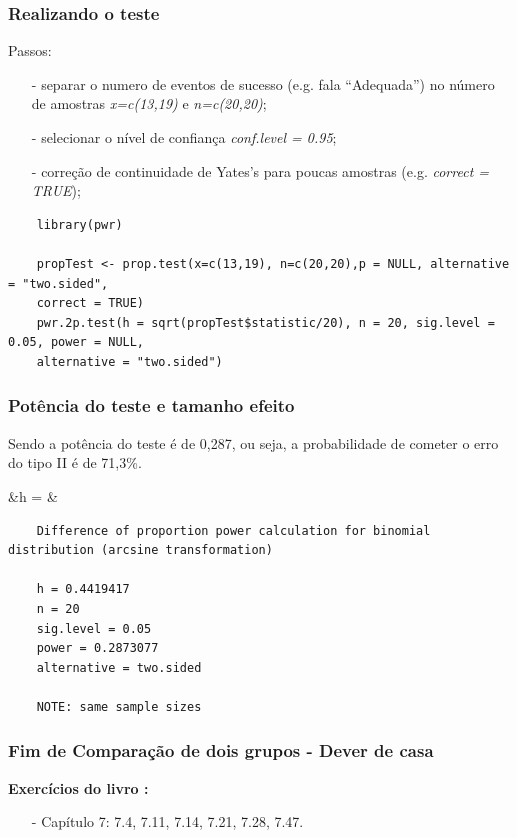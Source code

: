 \documentclass[graphics,14pt]{beamer}
\begin{document}
\begin{frame}[t,fragile=singleslide]
\frametitle{Realizando o teste}
	Passos: 
	\begin{itemize}
		\item[-] separar o numero de eventos de sucesso (e.g. fala ``Adequada'') no número de amostras \textit{x=c(13,19)} e \textit{n=c(20,20)};
		\item[-] selecionar o nível de confiança \textit{conf.level = 0.95};
		\item[-] correção de continuidade de Yates's para poucas amostras (e.g. \textit{correct = TRUE});
	\end{itemize}
	
	\begin{lstlisting}
	library(pwr)
	
	propTest <- prop.test(x=c(13,19), n=c(20,20),p = NULL, alternative = "two.sided",
	correct = TRUE)
	pwr.2p.test(h = sqrt(propTest$statistic/20), n = 20, sig.level = 0.05, power = NULL, 
	alternative = "two.sided")
	\end{lstlisting}

\end{frame}


\begin{frame}[t,fragile=singleslide]
	\frametitle{Potência do teste e tamanho efeito}
	
	Sendo a potência do teste é de 0,287, ou seja, a probabilidade de cometer o erro do tipo II é de 71,3\%.
	
	\begin{flalign*}
	&h =  & \\
	\end{flalign*}
	
	\begin{lstlisting}
	Difference of proportion power calculation for binomial distribution (arcsine transformation) 
	
	h = 0.4419417
	n = 20
	sig.level = 0.05
	power = 0.2873077
	alternative = two.sided
	
	NOTE: same sample sizes
	\end{lstlisting}
	\end{frame}
\begin{frame}[t,fragile=singleslide]
\frametitle{Fim de Comparação de dois grupos - Dever de casa}
\textbf{Exercícios do livro \cite{Agresti2018}:}
\begin{itemize}
	\item[-] Capítulo 7: 7.4, 7.11, 7.14, 7.21, 7.28, 7.47.
\end{itemize}
\end{frame}
\end{document}
